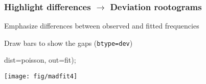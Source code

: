 \begin{frame}[fragile]
  \frametitle{Highlight differences $\rightarrow$ Deviation rootograms}
  \begin{itemize*}
  \item Emphasize differences between observed and fitted frequencies
  \item Draw bars to show the gaps (\texttt{btype=dev})
  \end{itemize*}

  \begin{Code}
     dist=poisson, out=fit);
  \end{Code}
    \begin{center}
	\texttt{[image: fig/madfit4]}
    \end{center}

\end{frame}

